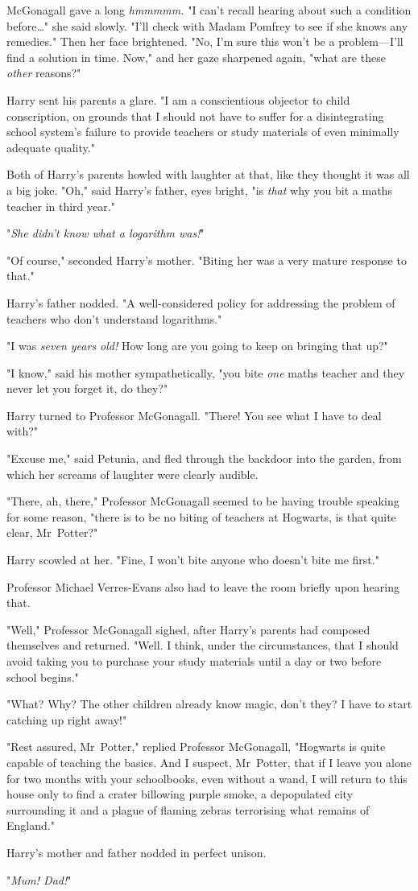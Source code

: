 McGonagall gave a long \emph{hmmmmm.} "I can't recall hearing about such a
condition before{\ldots}" she said slowly. "I'll check with Madam Pomfrey to
see if she knows any remedies." Then her face brightened. "No, I'm sure this
won't be a problem---I'll find a solution in time. Now," and her gaze sharpened
again, "what are these \emph{other} reasons?"

Harry sent his parents a glare. "I am a conscientious objector to child
conscription, on grounds that I should not have to suffer for a disintegrating
school system's failure to provide teachers or study materials of even
minimally adequate quality."

Both of Harry's parents howled with laughter at that, like they thought it was
all a big joke. "Oh," said Harry's father, eyes bright, "is \emph{that} why you
bit a maths teacher in third year."

"\emph{She didn't know what a logarithm was!}"

"Of course," seconded Harry's mother. "Biting her was a very mature response to
that."

Harry's father nodded. "A well-considered policy for addressing the problem of
teachers who don't understand logarithms."

"I was \emph{seven years old!} How long are you going to keep on bringing that
up?"

"I know," said his mother sympathetically, "you bite \emph{one} maths teacher
and they never let you forget it, do they?"

Harry turned to Professor McGonagall. "There! You see what I have to deal with?"

"Excuse me," said Petunia, and fled through the backdoor into the garden, from
which her screams of laughter were clearly audible.

"There, ah, there," Professor McGonagall seemed to be having trouble speaking
for some reason, "there is to be no biting of teachers at Hogwarts, is that
quite clear, Mr~Potter?"

Harry scowled at her. "Fine, I won't bite anyone who doesn't bite me first."

Professor Michael Verres-Evans also had to leave the room briefly upon hearing
that.

"Well," Professor McGonagall sighed, after Harry's parents had composed
themselves and returned. "Well. I think, under the circumstances, that I should
avoid taking you to purchase your study materials until a day or two before
school begins."

"What? Why? The other children already know magic, don't they? I have to start
catching up right away!"

"Rest assured, Mr~Potter," replied Professor McGonagall, "Hogwarts is quite
capable of teaching the basics. And I suspect, Mr~Potter, that if I leave you
alone for two months with your schoolbooks, even without a wand, I will return
to this house only to find a crater billowing purple smoke, a depopulated city
surrounding it and a plague of flaming zebras terrorising what remains of
England."

Harry's mother and father nodded in perfect unison.

"\emph{Mum! Dad!}"
